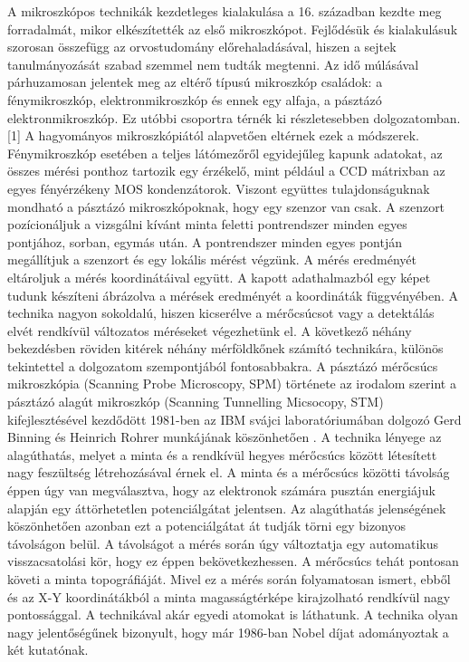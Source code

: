 A mikroszkópos technikák kezdetleges kialakulása a 16. században kezdte meg forradalmát, mikor elkészítették az első mikroszkópot. Fejlődésük és kialakulásuk szorosan összefügg az orvostudomány előrehaladásával, hiszen a sejtek tanulmányozását szabad szemmel nem tudták megtenni. Az idő múlásával párhuzamosan jelentek meg az eltérő típusú mikroszkóp családok: a fénymikroszkóp, elektronmikroszkóp és ennek egy alfaja, a pásztázó elektronmikroszkóp. Ez utóbbi csoportra térnék ki részletesebben dolgozatomban. [1]
A hagyományos mikroszkópiától alapvetően eltérnek ezek a módszerek. Fénymikroszkóp esetében a teljes látómezőről egyidejűleg kapunk adatokat, az összes mérési ponthoz tartozik egy érzékelő, mint például a CCD mátrixban az egyes fényérzékeny MOS kondenzátorok. Viszont együttes tulajdonságuknak mondható a pásztázó mikroszkópoknak, hogy egy szenzor van csak. A szenzort pozícionáljuk a vizsgálni kívánt minta feletti pontrendszer minden egyes pontjához, sorban, egymás után. A pontrendszer minden egyes pontján megállítjuk a szenzort és egy lokális mérést végzünk. A mérés eredményét eltároljuk a mérés koordinátáival együtt. A kapott adathalmazból egy képet tudunk készíteni ábrázolva a mérések eredményét a koordináták függvényében. A technika nagyon sokoldalú, hiszen kicserélve a mérőcsúcsot vagy a detektálás elvét rendkívül változatos méréseket végezhetünk el. A következő néhány bekezdésben röviden kitérek néhány mérföldkőnek számító technikára, különös tekintettel a dolgozatom szempontjából fontosabbakra. 
A pásztázó mérőcsúcs mikroszkópia (Scanning Probe Microscopy, SPM) története az irodalom szerint a pásztázó alagút mikroszkóp (Scanning Tunnelling Micsocopy, STM) kifejlesztésével kezdődött 1981-ben az IBM svájci laboratóriumában dolgozó Gerd Binning és Heinrich Rohrer munkájának köszönhetően \cite{binnig1982tunneling}. A technika lényege az alagúthatás, melyet a minta és a rendkívül hegyes mérőcsúcs között létesített nagy feszültség létrehozásával érnek el. A minta és a mérőcsúcs közötti távolság éppen úgy van megválasztva, hogy az elektronok számára pusztán energiájuk alapján egy áttörhetetlen potenciálgátat jelentsen. Az alagúthatás jelenségének köszönhetően azonban ezt a potenciálgátat át tudják törni egy bizonyos távolságon belül. A távolságot a mérés során úgy változtatja egy automatikus visszacsatolási kör, hogy ez éppen bekövetkezhessen. A mérőcsúcs tehát pontosan követi a minta topográfiáját. Mivel ez a mérés során folyamatosan ismert, ebből és az X-Y koordinátákból a minta magasságtérképe kirajzolható rendkívül nagy pontossággal. A technikával akár egyedi atomokat is láthatunk. A technika olyan nagy jelentőségűnek bizonyult, hogy már 1986-ban Nobel díjat adományoztak a két kutatónak.
